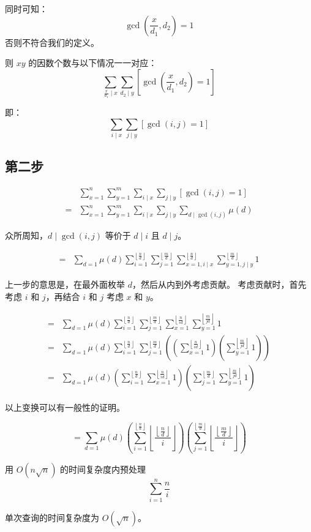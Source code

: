 \documentclass[UTF8]{article}
\newcommand{\floorfrac}[2]{\left\lfloor \frac {#1} {#2} \right\rfloor}
\begin{document}
	同时可知：
	$$
	\gcd(\frac {x} {d_1} , d_2) = 1
	$$
	否则不符合我们的定义。

	则 $xy$ 的因数个数与以下情况一一对应：
	$$
	\sum_{\frac {x} {d_1} \mid x} \sum_{d_2 \mid y} [\gcd(\frac {x} {d_1}, d_2) = 1]
	$$

	即：
	$$
	\sum_{i \mid x} \sum_{j \mid y} [\gcd(i, j) = 1]
	$$

	\subsection{第二步}

	\begin{align*}&
		\sum_{x = 1}^{n} \sum_{y = 1}^{m}
		\sum_{i \mid x} \sum_{j \mid y} [\gcd(i, j) = 1]
		\\=&
		\sum_{x = 1}^{n} \sum_{y = 1}^{m}
		\sum_{i \mid x} \sum_{j \mid y}
		\sum_{d \mid \gcd(i, j)} \mu(d)
	\end{align*}

	众所周知，$d \mid \gcd(i, j)$ 等价于 $d \mid i$ 且 $d \mid j$。

	\begin{align*}=&
		\sum_{d = 1} \mu(d)
		\sum_{i = 1}^{\floorfrac nd}
		\sum_{j = 1}^{\floorfrac md}
		\sum_{x = 1, i \mid x}^{\floorfrac nd}
		\sum_{y = 1, j \mid y}^{\floorfrac md}
		1
	\end{align*}

	上一步的意思是，在最外面枚举 $d$，然后从内到外考虑贡献。
	考虑贡献时，首先考虑 $i$ 和 $j$，再结合 $i$ 和 $j$ 考虑 $x$ 和 $y$。

	\begin{align*}=&
		\sum_{d = 1} \mu(d)
		\sum_{i = 1}^{\floorfrac nd}
		\sum_{j = 1}^{\floorfrac md}
		\sum_{x = 1}^{\floorfrac n {id}}
		\sum_{y = 1}^{\floorfrac m {jd}}
		1
		\\=&
		\sum_{d = 1} \mu(d)
		\sum_{i = 1}^{\floorfrac nd}
		\sum_{j = 1}^{\floorfrac md}
		\left(
		\left( \sum_{x = 1}^{\floorfrac n {id}} 1 \right)
		\left( \sum_{y = 1}^{\floorfrac m {jd}} 1 \right)
		\right)
		\\=&
		\sum_{d = 1} \mu(d)
		\left(
		\sum_{i = 1}^{\floorfrac nd}
		\sum_{x = 1}^{\floorfrac n {id}} 1
		\right)
		\left(
		\sum_{j = 1}^{\floorfrac md}
		\sum_{y = 1}^{\floorfrac m {jd}} 1
		\right)
	\end{align*}

	以上变换可以有一般性的证明。

	$$
	= \sum_{d = 1} \mu(d)
	\left(
	\sum_{i = 1}^{\floorfrac nd} \floorfrac {\floorfrac n d} i
	\right)
	\left(
	\sum_{j = 1}^{\floorfrac md} \floorfrac {\floorfrac m d} i
	\right)
	$$

	\bigskip
	用 $O(n \sqrt n)$ 的时间复杂度内预处理
	$$
	\sum_{i = 1}^{n} \frac {n} {i}
	$$

	单次查询的时间复杂度为 $O(\sqrt n)$。
\end{document}
